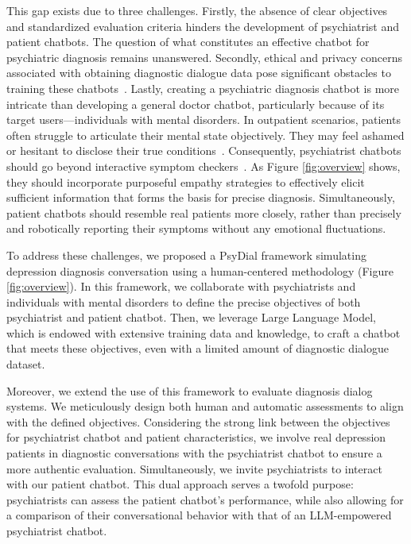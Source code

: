 This gap exists due to three challenges.
Firstly, the absence of clear objectives and standardized evaluation criteria hinders the development of psychiatrist and patient chatbots. The question of what constitutes an effective chatbot for psychiatric diagnosis remains unanswered. Secondly, ethical and privacy concerns associated with obtaining diagnostic dialogue data pose significant obstacles to training these chatbots~\cite{yao-etal-2022-d4}. 
Lastly, creating a psychiatric diagnosis chatbot is more intricate than developing a general doctor chatbot, particularly because of its target users—individuals with mental disorders. In outpatient scenarios, patients often struggle to articulate their mental state objectively. They may feel ashamed or hesitant to disclose their true conditions~\cite{Salaheddine2016Identify}.
Consequently, psychiatrist chatbots should 
go beyond interactive symptom checkers~\cite{Yue2023Beyond}. As Figure \ref{fig:overview} shows, they should incorporate purposeful empathy strategies to effectively elicit sufficient information that forms the basis for precise diagnosis.  Simultaneously, patient chatbots should resemble real patients more closely, rather than precisely and robotically reporting their symptoms without any emotional fluctuations. 

To address these challenges, we proposed a PsyDial framework simulating depression diagnosis conversation using a human-centered methodology (Figure \ref{fig:overview}). In this framework, we collaborate with psychiatrists and individuals with mental disorders to define the precise objectives of both psychiatrist and patient chatbot.
Then, we leverage Large Language Model, which is endowed with extensive training data and knowledge, to craft a chatbot that meets these objectives, even with a limited amount of diagnostic dialogue dataset. 

Moreover, we extend the use of this framework to evaluate diagnosis dialog systems. We meticulously design both human and automatic assessments to align with the defined objectives. Considering the strong link between the objectives for psychiatrist chatbot and patient characteristics, we involve real depression patients in diagnostic conversations with the psychiatrist chatbot to ensure a more authentic evaluation. 
Simultaneously, we invite psychiatrists to interact with our patient chatbot. This dual approach serves a twofold purpose: psychiatrists can assess the patient chatbot's performance, while also allowing for a comparison of their conversational behavior with that of an LLM-empowered psychiatrist chatbot.

